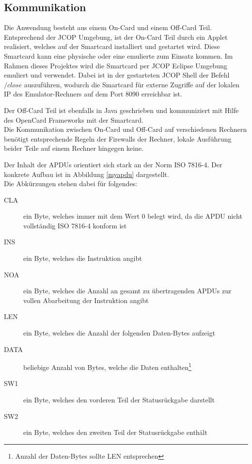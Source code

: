 \subsection{Kommunikation}
\label{subsec:3.0}

Die Anwendung besteht aus einem On-Card und einem Off-Card Teil.\\
Entsprechend der JCOP Umgebung, ist der On-Card Teil durch ein Applet realisiert, welches auf der Smartcard installiert und gestartet wird.
Diese Smartcard kann eine physische oder eine emulierte zum Einsatz kommen.
Im Rahmen dieses Projektes wird die Smartcard per JCOP Eclipse Umgebung emuliert und verwendet.
Dabei ist in der gestarteten JCOP Shell der Befehl $/close$ auszuführen, wodurch die Smartcard für externe  Zugriffe auf der lokalen IP des Emulator-Rechners auf dem Port 8090 erreichbar ist.

Der Off-Card Teil ist ebenfalls in Java geschrieben und kommuniziert mit Hilfe des OpenCard Frameworks mit der Smartcard.
\\

Die Kommunikation zwischen On-Card und Off-Card auf verschiedenen Rechnern benötigt entsprechende Regeln der Firewalls der Rechner, lokale Ausführung beider Teile auf einem Rechner hingegen keine.

Der Inhalt der APDUs orientiert sich stark an der Norm ISO 7816-4. Der konkrete Aufbau ist in Abbildung \ref{myapdu} dargestellt.\\
Die Abkürzungen stehen dabei für folgendes:
\begin{description}
\item[CLA] ein Byte, welches immer mit dem Wert 0 belegt wird, da die APDU nicht vollständig ISO 7816-4 konform ist
\item[INS] ein Byte, welches die Instruktion angibt
\item[NOA] ein Byte, welches die Anzahl an gesamt zu übertragenden APDUs zur vollen Abarbeitung der Instruktion angibt
\item[LEN] ein Byte, welches die Anzahl der folgenden Daten-Bytes aufzeigt
\item[DATA] beliebige Anzahl von Bytes, welche die Daten enthalten\footnote{Anzahl der Daten-Bytes sollte LEN entsprechen}
\item[SW1] ein Byte, welches den vorderen Teil der Statusrückgabe darstellt
\item[SW2] ein Byte, welches den zweiten Teil der Statusrückgabe enthält
\end{description}

